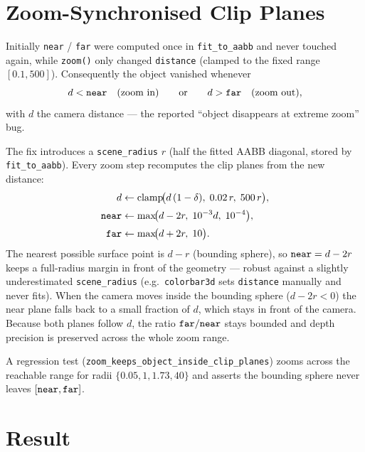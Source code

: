 \documentclass[11pt]{article}
\begin{document}
\section{Zoom-Synchronised Clip Planes}
\label{sec:clip}

Initially \texttt{near} / \texttt{far} were computed once in
\texttt{fit\_to\_aabb} and never touched again, while \texttt{zoom()}
only changed \texttt{distance} (clamped to the fixed range
$[0.1, 500]$).  Consequently the object vanished whenever
\[
  d < \text{\texttt{near}} \quad (\text{zoom in}) \qquad\text{or}\qquad
  d > \text{\texttt{far}} \quad (\text{zoom out}),
\]
with $d$ the camera distance --- the reported ``object disappears at
extreme zoom'' bug.

The fix introduces a \texttt{scene\_radius} $r$ (half the fitted AABB
diagonal, stored by \texttt{fit\_to\_aabb}).  Every zoom step
recomputes the clip planes from the new distance:
\begin{align}
  d &\leftarrow \operatorname{clamp}\!\bigl(d\,(1-\delta),\;
        0.02\,r,\; 500\,r\bigr), \\[2pt]
  \text{\texttt{near}} &\leftarrow \max\!\bigl(d - 2r,\;
        10^{-3} d,\; 10^{-4}\bigr), \\[2pt]
  \text{\texttt{far}} &\leftarrow \max\!\bigl(d + 2r,\; 10\bigr).
\end{align}
The nearest possible surface point is $d - r$ (bounding sphere), so
$\text{\texttt{near}} = d - 2r$ keeps a full-radius margin in front of
the geometry --- robust against a slightly underestimated
\texttt{scene\_radius} (e.g.\ \texttt{colorbar3d} sets \texttt{distance}
manually and never fits).  When the camera moves inside the bounding
sphere ($d - 2r < 0$) the near plane falls back to a small fraction of
$d$, which stays in front of the camera.  Because both planes follow
$d$, the ratio $\text{\texttt{far}}/\text{\texttt{near}}$ stays bounded
and depth precision is preserved across the whole zoom range.

A regression test (\texttt{zoom\_keeps\_object\_inside\_clip\_planes})
zooms across the reachable range for radii
$\{0.05, 1, 1.73, 40\}$ and asserts the bounding sphere never leaves
$[\text{\texttt{near}}, \text{\texttt{far}}]$.

\section{Result}
\end{document}
